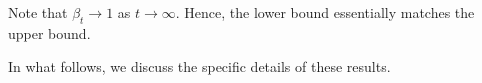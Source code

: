 Note that $\beta_t \to 1$ as $t\to\infty$. Hence, the lower bound essentially matches the upper bound.
\begin{comment}

Consider the LSA with $b_t=0$, and $P^0$ has all the mass concentrated on $A_{P^0}=\begin{bmatrix} \lambda_{\min} &0\\ 0& \lambda_{\max}\end{bmatrix}$, for some $\lambda_{\max}>\lambda_{\min}>0$. Note that in this example $\ts=0$.
By choosing $\alpha<\frac2{\lambda_{\max}}$, in this case it is straightforward to write the expression for $\eh_t$ explicitly as below:
\begin{align*}
\eh_t&=\frac{1}{t+1}\sum_{s=0}^t e_t = \frac{1}{t+1}\sum_{s=0}^t (I-\alpha A_P)^{t-s} e_0\\
&=\frac{1}{t+1}(\alpha A)^{-1}\left(I-(I-\alpha A)^{t+1}\right)e_0
\end{align*}

\begin{align*}
\norm{\eh_t}^2&=\frac{1}{(t+1)^2}\norm{(\alpha A_P)^{-1}\left(I-(I-\alpha A_P)^{t+1}\right)e_0}^2
&\leq\frac{1}{(t+1)^2}\alpha^2\norm{A_P^{-1}}^2\norm{e_0}^2
\end{align*}

\begin{align*}
\norm{\eh_t}^2\geq \eh^2_t(1)=\frac{1}{(t+1)^2}(\alpha \lambda_{\min})^{-2}(1-\alpha \lambda_{\min}^t) \theta^2_0(1)
\end{align*}
Note that in this example, $\rhos{P^0}=\rhod{P^0}=\lambda_{\min} -\alpha \lambda_{\min}^2=\lambda_{\min}(1-\alpha \lambda_{\min})$. Sandwiching the error between the lower and upper bounds we have
\begin{align}
\frac{1}{(t+1)^2}(\alpha \lambda_{\min})^{-2}(1-\alpha \lambda_{\min}^t) \theta^2_0(1)\leq \norm{\eh_t}^2\leq
\frac{1}{(t+1)^2} \left(\alpha^{-1}\rhos{P^0}+\alpha^{-2}\rhos{P^0}^2\right)\norm{\theta_0}^2
\end{align}
\end{comment}
In what follows, we discuss the specific details of these results. 

